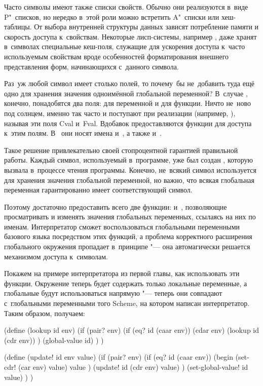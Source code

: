 Часто символы имеют также списки свойств. Обычно они реализуются в~виде
P"~списков, но нередко в~этой роли можно встретить A"~списки или хеш-таблицы. От
выбора внутренней структуры данных зависят потребление памяти и скорость доступа
к~свойствам. Некоторые лисп-системы, например {\LeLisp}, даже хранят в~символах
специальные кеш-поля, служащие для ускорения доступа к~часто используемым
свойствам вроде особенностей форматирования внешнего представления форм,
начинающихся с~данного символа.

Раз~уж любой символ имеет столько полей, то почему~бы не~добавить туда ещё одно
для хранения значения одноимённой глобальной переменной? В~случае ,
конечно, понадобятся два поля: для переменной и для функции. Ничто не~ново под
солнцем, именно так часто и поступают при реализации (например,
\cite{cha80,gp88}), называя эти поля Cval и~Fval. Вдобавок предоставляются
функции для доступа к~этим полям. В~{\CommonLisp} они носят имена
 и~, а также 
и~.

Такое решение привлекательно своей стопроцентной гарантией правильной работы.
Каждый символ, используемый в~программе, уже был создан ,
которую вызвала  в~процессе чтения программы. Конечно, не~всякий символ
используется для хранения значения глобальной переменной, но важно, что всякая
глобальная переменная гарантированно имеет соответствующий символ.

Поэтому достаточно предоставить всего две функции: 
и~, позволяющие просматривать и изменять значения
глобальных переменных, ссылаясь на них по именам. Интерпретатор 
сможет воспользоваться глобальными переменными базового языка посредством этих
функций, а проблема корректного расширения глобального окружения пропадает
в~принципе "--- она автомагически решается механизмом доступа к~символам.

Покажем на примере интерпретатора из первой главы, как использовать эти функции.
Окружение  теперь будет содержать только локальные переменные, а
глобальные будут использоваться напрямую "--- теперь они совпадают с~глобальными
переменными того Scheme, на котором написан интерпретатор. Таким образом,
получаем:

\begin{code:lisp}
(define (lookup id env)
  (if (pair? env)
      (if (eq? id (caar env))
          (cdar env)
          (lookup id (cdr env)) )
      (global-value id) ) )

(define (update! id env value)
  (if (pair? env)
      (if (eq? id (caar env))
          (begin (set-cdr! (car env) value)
                 value )
          (update! id (cdr env) value) )
      (set-global-value! id value) ) )
\end{code:lisp}

